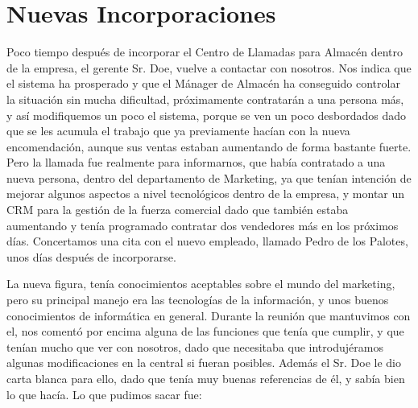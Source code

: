 
\newpage

\color[rgb]{0,0,1}

\section{Nuevas Incorporaciones}

Poco tiempo después de incorporar el Centro de Llamadas para Almacén dentro de la empresa, el gerente Sr. Doe, vuelve a contactar con nosotros. Nos indica que el sistema ha prosperado y que el Mánager de Almacén ha conseguido controlar la situación sin mucha dificultad, próximamente contratarán a una persona más, y así modifiquemos un poco el sistema, porque se ven un poco desbordados dado que se les acumula el trabajo que ya previamente hacían con la nueva encomendación, aunque sus ventas estaban aumentando de forma bastante fuerte. Pero la llamada fue realmente para informarnos, que había contratado a una nueva persona, dentro del departamento de Marketing, ya que tenían intención de mejorar algunos aspectos a nivel tecnológicos dentro de la empresa, y montar un CRM para la gestión de la fuerza comercial dado que también estaba aumentando y tenía programado contratar dos vendedores más en los próximos días. Concertamos una cita con el nuevo empleado, llamado Pedro de los Palotes, unos días después de incorporarse.

La nueva figura, tenía conocimientos aceptables sobre el mundo del marketing, pero su principal manejo era las tecnologías de la información, y unos buenos conocimientos de informática en general. Durante la reunión que mantuvimos con el, nos comentó por encima alguna de las funciones que tenía que cumplir, y que tenían mucho que ver con nosotros, dado que necesitaba que introdujéramos algunas modificaciones en la central si fueran posibles. Además el Sr. Doe le dio carta blanca para ello, dado que tenía muy buenas referencias de él, y sabía bien lo que hacía. Lo que pudimos sacar fue:

